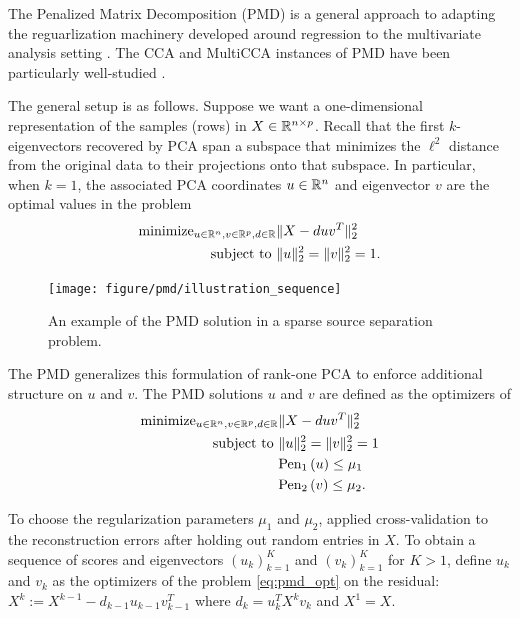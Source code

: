 \documentclass{article}
\begin{document}
The Penalized Matrix Decomposition (PMD) is a general approach to adapting the
reguarlization machinery developed around regression to the multivariate
analysis setting \citep{witten2009penalized}. The CCA and MultiCCA instances of
PMD have been particularly well-studied \citep{witten2009penalized,
  witten2013package}.

The general setup is as follows. Suppose we want a one-dimensional
representation of the samples (rows) in $X \in \mathbb{R}^{n \times p}$. Recall that
the first $k$-eigenvectors recovered by PCA span a subspace that minimizes the
$\ell^{2}$ distance from the original data to their projections onto that
subspace. In particular, when $k = 1$, the associated PCA coordinates $u \in
\mathbb{R}^{n}$ and eigenvector $v$ are the optimal values in the problem
\begin{align*}
  \text{minimize}_{u \in \mathbb{R}^{n}, v \in \mathbb{R}^{p}, d \in \mathbb{R}} &\|X - duv^{T}\|_{2}^{2} \\
  \text{subject to } &\|u\|_{2}^{2} = \|v\|_{2}^{2} = 1.
\end{align*}

\begin{figure}
  \centering
  \texttt{[image: figure/pmd/illustration\_sequence]}
  \caption{An example of the PMD solution in a sparse source separation
    problem. \label{fig:pmd_illustration_sequence} }
\end{figure}

The PMD generalizes this formulation of rank-one PCA to enforce additional
structure on $u$ and $v$. The PMD solutions $u$ and $v$ are defined as the
optimizers of
\begin{align}
\label{eq:pmd_opt} \text{minimize}_{u \in \mathbb{R}^{n}, v \in \mathbb{R}^{p}, d
  \in \mathbb{R}} &\|X - duv^{T}\|_{2}^{2} \\
  \text{subject to } &\|u\|_{2}^{2} = \|v\|_{2}^{2} = 1 \nonumber \\ 
  & \text{Pen}_{1}\left(u\right) \leq \mu_{1} \nonumber \\
  & \text{Pen}_{2}\left(v\right) \leq \mu_{2}. \nonumber
\end{align}

To choose the regularization parameters $\mu_{1}$ and $\mu_{2}$,
\citep{witten2009penalized} applied cross-validation to the reconstruction
errors after holding out random entries in $X$. To obtain a sequence of scores
and eigenvectors $\left(u_{k}\right)_{k = 1}^{K}$ and $\left(v_{k}\right)_{k =
  1}^{K}$ for $K > 1$, define $u_{k}$ and $v_{k}$ as the optimizers of the
problem \ref{eq:pmd_opt} on the residual: $X^{k} := X^{k - 1} - d_{k - 1}u_{k -
  1}v_{k - 1}^{T}$ where $d_{k} = u_{k}^{T} X^{k}v_{k}$ and $X^{1} = X$.
\end{document}
